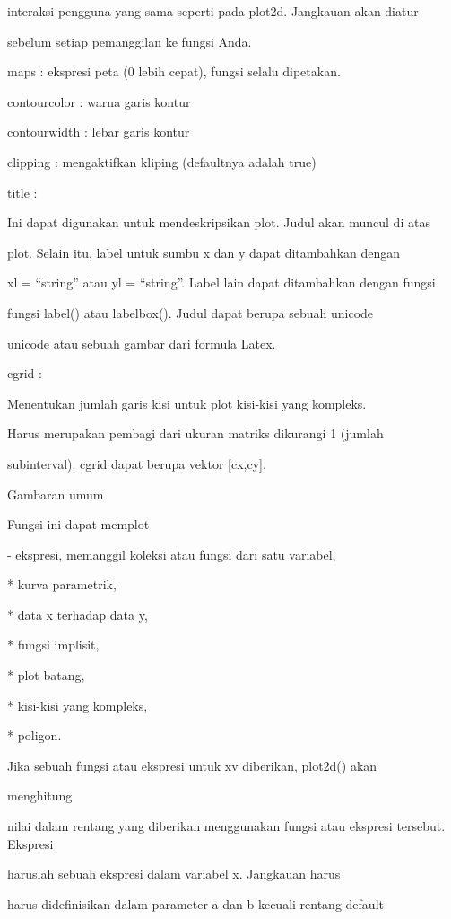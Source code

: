 \documentclass{article}
\begin{document}
  interaksi pengguna yang sama seperti pada plot2d. Jangkauan akan
diatur


  sebelum setiap pemanggilan ke fungsi Anda.


maps : ekspresi peta (0 lebih cepat), fungsi selalu dipetakan.


contourcolor : warna garis kontur


contourwidth : lebar garis kontur


clipping : mengaktifkan kliping (defaultnya adalah true)


title :


  Ini dapat digunakan untuk mendeskripsikan plot. Judul akan muncul di
atas


  plot. Selain itu, label untuk sumbu x dan y dapat ditambahkan dengan


  xl = “string” atau yl = “string”. Label lain dapat ditambahkan
dengan fungsi


  fungsi label() atau labelbox(). Judul dapat berupa sebuah unicode


  unicode atau sebuah gambar dari formula Latex.


cgrid :


  Menentukan jumlah garis kisi untuk plot kisi-kisi yang kompleks.


  Harus merupakan pembagi dari ukuran matriks dikurangi 1 (jumlah


  subinterval). cgrid dapat berupa vektor [cx,cy].


 Gambaran umum  

 Fungsi ini dapat memplot  

 - ekspresi, memanggil koleksi atau fungsi dari satu variabel,  

* 
kurva parametrik,

* 
data x terhadap data y,

* 
fungsi implisit,

* 
plot batang,

* 
kisi-kisi yang kompleks,

* 
poligon.


 Jika sebuah fungsi atau ekspresi untuk xv diberikan, plot2d() akan  

menghitung


nilai dalam rentang yang diberikan menggunakan fungsi atau ekspresi
tersebut. Ekspresi


haruslah sebuah ekspresi dalam variabel x. Jangkauan harus


harus didefinisikan dalam parameter a dan b kecuali rentang default
\end{document}
